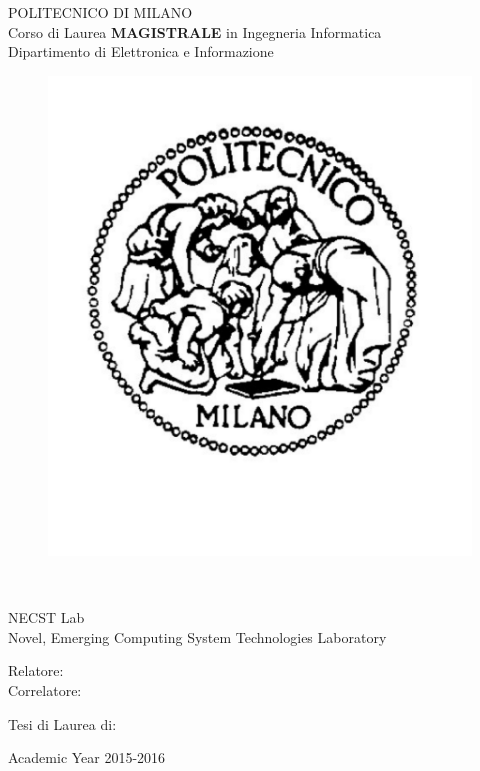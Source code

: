 \documentclass[]{book}
\begin{document}
\thispagestyle{empty}
\vspace*{-1.5cm} \bfseries{
\begin{center}
	
	\large
  		POLITECNICO DI MILANO\\
  	
  	\normalsize
  		Corso di Laurea \textbf{MAGISTRALE} in Ingegneria Informatica\\
  		Dipartimento di Elettronica e Informazione\\
  		
  	\begin{figure}[htbp]
   		\begin{center}
      		\includegraphics [width = 3.5 cm]{./pictures/logopm}
    	\end{center}
  	\end{figure}
  	
\end{center}

\vspace*{2 cm}
\begin{center}
  	
  	\vspace*{0.3 cm} \LARGE

	\textbf{}\\

	\vspace*{.75 true cm} \large
  
  		NECST Lab \\
  		Novel, Emerging Computing System Technologies Laboratory\\
  		
\end{center}

\vspace*{3.0 cm} \large

\begin{minipage}[b]{.45\linewidth}
	\begin{flushleft}
  		Relatore: \\
  		Correlatore: \\ 
	\end{flushleft}
\end{minipage}
\begin{minipage}[b]{.45\linewidth}
	\begin{flushright}
  		Tesi di Laurea di:\\ 
	\end{flushright}
\end{minipage}

\vspace*{0.5 cm}

\begin{center}
	Academic Year 2015-2016
\end{center} \clearpage

}
\end{document}
